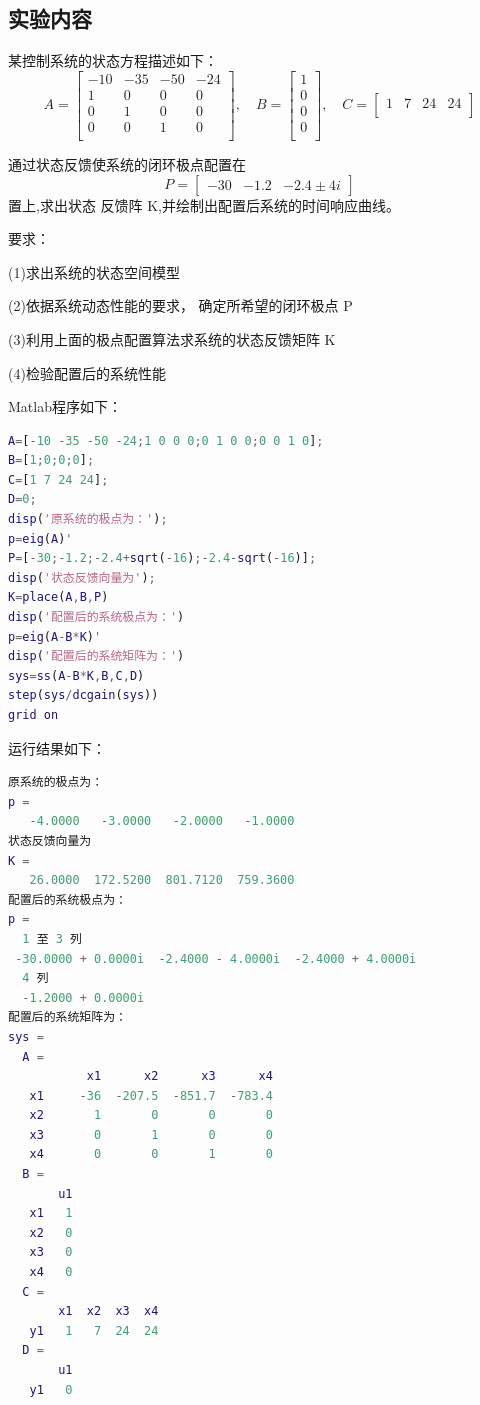 \documentclass[UTF8]{ctexart}
\begin{document}
\subsection{实验内容 }
\par 某控制系统的状态方程描述如下：	
\begin{equation}
    A=\begin{bmatrix}
    -10 & -35 & -50 & -24\\
    1 & 0 & 0 & 0\\
    0 & 1 & 0 & 0\\
    0 & 0 & 1 & 0\\ \end{bmatrix}  , \quad B=\begin{bmatrix}
   1\\
   0\\
   0\\
   0\\ \end{bmatrix}   , \quad  C=\begin{bmatrix}
   1 & 7 & 24 & 24\\ \end{bmatrix}
\end{equation}		
\par 通过状态反馈使系统的闭环极点配置在\[P=\begin{bmatrix}-30 & -1.2 & -2.4 \pm 4i \end{bmatrix}\]置上,求出状态 反馈阵 K,并绘制出配置后系统的时间响应曲线。
\par 要求：
\par  (1)求出系统的状态空间模型
\par  (2)依据系统动态性能的要求， 确定所希望的闭环极点 P
\par  (3)利用上面的极点配置算法求系统的状态反馈矩阵 K
\par  (4)检验配置后的系统性能
\par Matlab程序如下：		
\par  \begin{lstlisting}[language=matlab,escapeinside=``]			
A=[-10 -35 -50 -24;1 0 0 0;0 1 0 0;0 0 1 0];
B=[1;0;0;0];
C=[1 7 24 24];
D=0;
disp('原系统的极点为：');
p=eig(A)'
P=[-30;-1.2;-2.4+sqrt(-16);-2.4-sqrt(-16)];
disp('状态反馈向量为');
K=place(A,B,P)
disp('配置后的系统极点为：')
p=eig(A-B*K)'
disp('配置后的系统矩阵为：')
sys=ss(A-B*K,B,C,D)
step(sys/dcgain(sys))
grid on
\end{lstlisting}		
\par 运行结果如下：		
\par  \begin{lstlisting}[language=matlab,escapeinside=``]			
原系统的极点为：
p =
   -4.0000   -3.0000   -2.0000   -1.0000
状态反馈向量为
K =
   26.0000  172.5200  801.7120  759.3600
配置后的系统极点为：
p =
  1 至 3 列
 -30.0000 + 0.0000i  -2.4000 - 4.0000i  -2.4000 + 4.0000i
  4 列
  -1.2000 + 0.0000i
配置后的系统矩阵为：
sys =
  A = 
           x1      x2      x3      x4
   x1     -36  -207.5  -851.7  -783.4
   x2       1       0       0       0
   x3       0       1       0       0
   x4       0       0       1       0
  B = 
       u1
   x1   1
   x2   0
   x3   0
   x4   0
  C = 
       x1  x2  x3  x4
   y1   1   7  24  24
  D = 
       u1
   y1   0
\end{lstlisting}		
\end{document}
